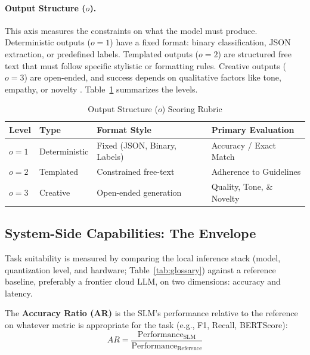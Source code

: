 \documentclass[11pt]{article}
\begin{document}
\paragraph{Output Structure ($o$).}
This axis measures the constraints on what the model must produce. Deterministic outputs ($o=1$) have a fixed format: binary classification, JSON extraction, or predefined labels. Templated outputs ($o=2$) are structured free text that must follow specific stylistic or formatting rules. Creative outputs ($o=3$) are open-ended, and success depends on qualitative factors like tone, empathy, or novelty \cite{Bubeck2023}. Table~\ref{tab:output} summarizes the levels.

\begin{table}[ht]
  \centering
  \caption{Output Structure ($o$) Scoring Rubric}
  \label{tab:output}
  \begin{tabular}{@{}llll@{}}
    \toprule
    Level & Type & Format Style & Primary Evaluation \\
    \midrule
    $o=1$ & Deterministic & Fixed (JSON, Binary, Labels) & Accuracy / Exact Match \\
    $o=2$ & Templated & Constrained free-text & Adherence to Guidelines \\
    $o=3$ & Creative & Open-ended generation & Quality, Tone, \& Novelty \\
    \bottomrule
  \end{tabular}
\end{table}

\subsection{System-Side Capabilities: The Envelope}
\label{sec:system}

Task suitability is measured by comparing the local inference stack (model, quantization level, and hardware; Table~\ref{tab:glossary}) \cite{Dettmers2024} against a reference baseline, preferably a frontier cloud LLM, on two dimensions: accuracy and latency.

The \textbf{Accuracy Ratio (AR)} is the SLM's performance relative to the reference on whatever metric is appropriate for the task (e.g., F1, Recall, BERTScore):
\begin{equation}
  AR = \frac{\text{Performance}_{\text{SLM}}}{\text{Performance}_{\text{Reference}}}
  \label{eq:ar}
\end{equation}
\end{document}
